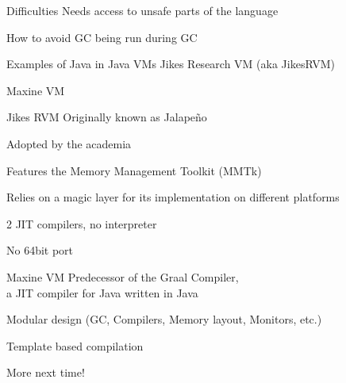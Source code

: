 \documentclass[
14pt,
aspectratio=169,
usenames,
dvipsnames,
x11names]{beamer}
\begin{document}
\begin{frame}{Difficulties}
  Needs access to \alert{unsafe} parts of the language

  \vfill

  How to \alert{avoid GC} being run \alert{during GC}
\end{frame}

\begin{frame}{Examples of Java in Java VMs}
  Jikes Research VM (aka JikesRVM)

  \vfill

  Maxine VM

\end{frame}

\begin{frame}{Jikes RVM}
  Originally known as \alert{Jalape\~no}

  \vfill

  Adopted by the \alert{academia}

  \vfill

  Features the \alert{Memory Management Toolkit} (MMTk)

  \vfill

  Relies on a \alert{magic} layer for its implementation on different platforms

  \vfill

  2 JIT compilers, \alert{no interpreter}

  \vfill

  No 64bit port
\end{frame}

\begin{frame}{Maxine VM}
  Predecessor of the Graal Compiler,\\ a JIT compiler for Java written in Java

  \vfill

  Modular design (GC, Compilers, Memory layout, Monitors, etc.)

  \vfill

  Template based compilation

  \vfill

  More next time!
\end{frame}



\end{document}
